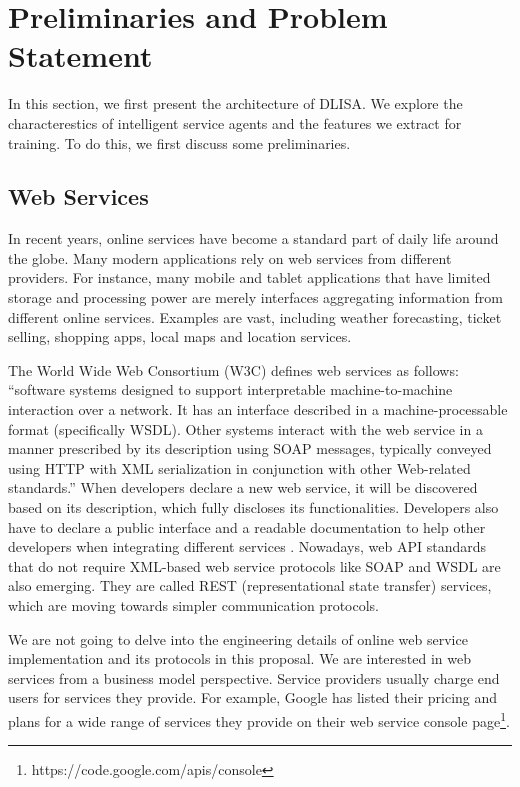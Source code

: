 \documentclass[10pt,journal,cspaper,compsoc]{IEEEtran}
\begin{document}



\section{Preliminaries and Problem Statement}\label{s:preliminaries}
In this section, we first present the architecture of DLISA. We explore the characterestics of intelligent service agents and the features we extract for training. To do this, we first discuss some preliminaries.

\subsection{Web Services}\label{s:ws}

In recent years, online services have become a standard part of daily life around the globe. Many modern applications rely on web services from different providers. For instance, many mobile and tablet applications that have limited storage and processing power are merely interfaces aggregating information from different online services. Examples are vast, including weather forecasting, ticket selling, shopping apps, local maps and location services.

The World Wide Web Consortium (W3C) defines web services as follows: ``software systems designed to support interpretable machine-to-machine interaction over a network. It has an interface described in a machine-processable format (specifically WSDL). Other systems interact with the web service in a manner prescribed by its description using SOAP messages, typically conveyed using HTTP with XML serialization in conjunction with other Web-related standards.'' When developers declare a new web service, it will be
discovered based on its description, which fully discloses its functionalities. Developers also have to declare a public interface and a readable documentation to help other developers when integrating different services \cite{w3cwsdl}. Nowadays, web API standards that do not require XML-based web service protocols like SOAP and WSDL are also emerging. They are called REST (representational state transfer) services, which are moving towards simpler communication protocols. 

We are not going to delve into the engineering details of online web service implementation and its protocols in this proposal. We are interested in web services from a business model perspective. Service providers usually charge end users for services they provide. For example, Google has listed their pricing and plans for a wide range of services they provide on their web service console page\footnote{https://code.google.com/apis/console}.
\end{document}
